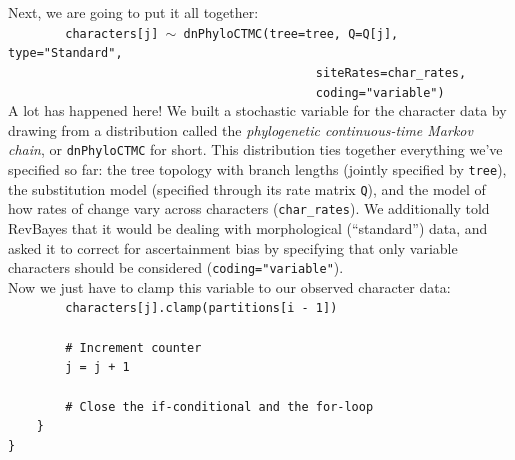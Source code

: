 \documentclass[12pt]{article}
\begin{document}
\noindent Next, we are going to put it all together: \\

\indent \texttt{\ \ \ \ \ \ \ \ characters[j] {\footnotesize $\sim$} dnPhyloCTMC(tree=tree, Q=Q[j], type="Standard",} \\
\indent \texttt{\ \ \ \ \ \ \ \ \ \ \ \ \ \ \ \ \ \ \ \ \ \ \ \ \ \ \ \ \ \ \ \ \ \ \ \ \ \ \ \ \ \ \ siteRates=char\_rates,} \\
\indent \texttt{\ \ \ \ \ \ \ \ \ \ \ \ \ \ \ \ \ \ \ \ \ \ \ \ \ \ \ \ \ \ \ \ \ \ \ \ \ \ \ \ \ \ \ coding="variable")}  \\

\noindent A lot has happened here! We built a stochastic variable for the character data by drawing from a distribution called the \textit{phylogenetic continuous-time Markov chain}, or \texttt{dnPhyloCTMC} for short. This distribution ties together everything we've specified so far: the tree topology with branch lengths (jointly specified by \texttt{tree}), the substitution model (specified through its rate matrix \texttt{Q}), and the model of how rates of change vary across characters (\texttt{char\_rates}). We additionally told RevBayes that it would be dealing with morphological (``standard'') data, and asked it to correct for ascertainment bias by specifying that only variable characters should be considered (\texttt{coding="variable"}). \\

\noindent Now we just have to clamp this variable to our observed character data: \\

\indent \texttt{\ \ \ \ \ \ \ \ characters[j].clamp(partitions[i - 1])} \\
\indent \texttt{\ \ \ \ \ \ \ \ } \\
\indent \texttt{\ \ \ \ \ \ \ \ \# Increment counter} \\
\indent \texttt{\ \ \ \ \ \ \ \ j = j + 1} \\
\indent \texttt{\ \ \ \ \ \ \ \ } \\
\indent \texttt{\ \ \ \ \ \ \ \ \# Close the if-conditional and the for-loop} \\
\indent \texttt{\ \ \ \ \}} \\
\indent \texttt{\}} \\
\end{document}
